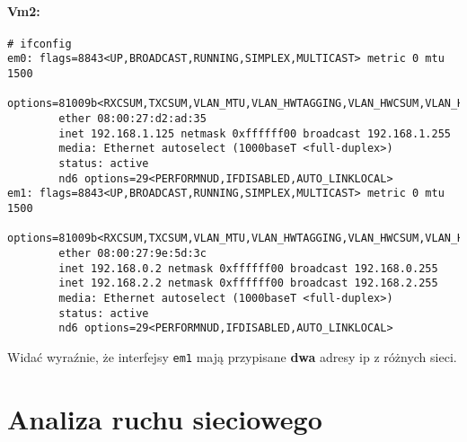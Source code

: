 \documentclass{mwart} %
\begin{document}
\paragraph{Vm2:}
\begin{verbatim}
# ifconfig
em0: flags=8843<UP,BROADCAST,RUNNING,SIMPLEX,MULTICAST> metric 0 mtu 1500
        options=81009b<RXCSUM,TXCSUM,VLAN_MTU,VLAN_HWTAGGING,VLAN_HWCSUM,VLAN_HWFILTER>
        ether 08:00:27:d2:ad:35
        inet 192.168.1.125 netmask 0xffffff00 broadcast 192.168.1.255
        media: Ethernet autoselect (1000baseT <full-duplex>)
        status: active
        nd6 options=29<PERFORMNUD,IFDISABLED,AUTO_LINKLOCAL>
em1: flags=8843<UP,BROADCAST,RUNNING,SIMPLEX,MULTICAST> metric 0 mtu 1500
        options=81009b<RXCSUM,TXCSUM,VLAN_MTU,VLAN_HWTAGGING,VLAN_HWCSUM,VLAN_HWFILTER>
        ether 08:00:27:9e:5d:3c
        inet 192.168.0.2 netmask 0xffffff00 broadcast 192.168.0.255
        inet 192.168.2.2 netmask 0xffffff00 broadcast 192.168.2.255
        media: Ethernet autoselect (1000baseT <full-duplex>)
        status: active
        nd6 options=29<PERFORMNUD,IFDISABLED,AUTO_LINKLOCAL>
\end{verbatim}

Widać wyraźnie, że interfejsy \texttt{em1} mają przypisane \textbf{dwa} adresy ip z różnych sieci.

\section{Analiza ruchu sieciowego}
\end{document}
